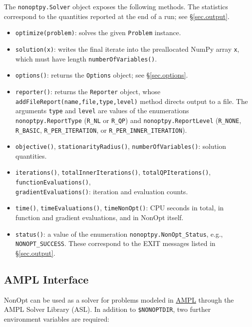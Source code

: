 \documentclass{article}
\begin{document}
The \texttt{nonoptpy.Solver} object exposes the following methods.  The statistics correspond to the quantities reported at the end of a run; see \S\ref{sec.output}.

\begin{itemize}
  \item \texttt{optimize(problem)}: solves the given \texttt{Problem} instance.
  \item \texttt{solution(x)}: writes the final iterate into the preallocated NumPy array \texttt{x}, which must have length \texttt{numberOfVariables()}.
  \item \texttt{options()}: returns the \texttt{Options} object; see \S\ref{sec.options}.
  \item \texttt{reporter()}: returns the \texttt{Reporter} object, whose \texttt{addFileReport(name,file,type,level)} method directs output to a file.  The arguments \texttt{type} and \texttt{level} are values of the enumerations \texttt{nonoptpy.ReportType} (\texttt{R\_NL} or \texttt{R\_QP}) and \texttt{nonoptpy.ReportLevel} (\texttt{R\_NONE}, \texttt{R\_BASIC}, \texttt{R\_PER\_ITERATION}, or \texttt{R\_PER\_INNER\_ITERATION}).
  \item \texttt{objective()}, \texttt{stationarityRadius()}, \texttt{numberOfVariables()}: solution quantities.
  \item \texttt{iterations()}, \texttt{totalInnerIterations()}, \texttt{totalQPIterations()}, \texttt{functionEvaluations()}, \\ \texttt{gradientEvaluations()}: iteration and evaluation counts.
  \item \texttt{time()}, \texttt{timeEvaluations()}, \texttt{timeNonOpt()}: CPU seconds in total, in function and gradient evaluations, and in NonOpt itself.
  \item \texttt{status()}: a value of the enumeration \texttt{nonoptpy.NonOpt\_Status}, e.g., \texttt{NONOPT\_SUCCESS}.  These correspond to the EXIT messages listed in \S\ref{sec.output}.
\end{itemize}

\subsection{AMPL Interface}\label{sec.ampl}

NonOpt can be used as a solver for problems modeled in \href{https://ampl.com}{AMPL} through the AMPL Solver Library (ASL).  In addition to \texttt{\$NONOPTDIR}, two further environment variables are required:
\end{document}
